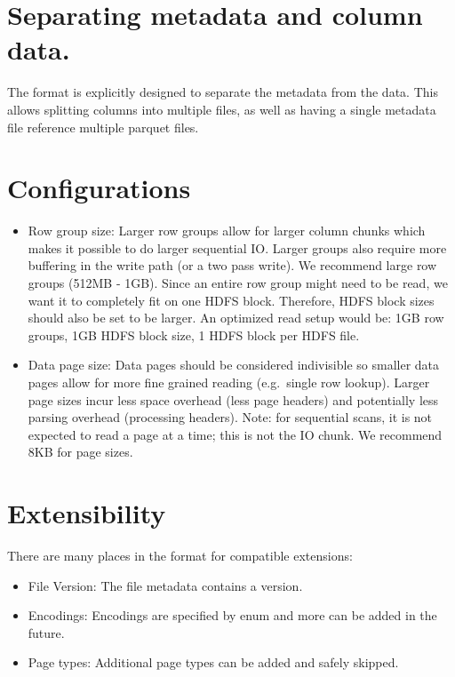 \documentclass[a4paper,12pt,notitlepage,twoside,openright]{article}
\begin{document}
\hypertarget{separating-metadata-and-column-data.}{%
\section{Separating metadata and column
data.}\label{separating-metadata-and-column-data.}}

The format is explicitly designed to separate the metadata from the
data. This allows splitting columns into multiple files, as well as
having a single metadata file reference multiple parquet files.

\hypertarget{configurations}{%
\section{Configurations}\label{configurations}}

\begin{itemize}

\item
  Row group size: Larger row groups allow for larger column chunks which
  makes it possible to do larger sequential IO. Larger groups also
  require more buffering in the write path (or a two pass write). We
  recommend large row groups (512MB - 1GB). Since an entire row group
  might need to be read, we want it to completely fit on one HDFS block.
  Therefore, HDFS block sizes should also be set to be larger. An
  optimized read setup would be: 1GB row groups, 1GB HDFS block size, 1
  HDFS block per HDFS file.
\item
  Data page size: Data pages should be considered indivisible so smaller
  data pages allow for more fine grained reading (e.g.~single row
  lookup). Larger page sizes incur less space overhead (less page
  headers) and potentially less parsing overhead (processing headers).
  Note: for sequential scans, it is not expected to read a page at a
  time; this is not the IO chunk. We recommend 8KB for page sizes.
\end{itemize}

\hypertarget{extensibility}{%
\section{Extensibility}\label{extensibility}}

There are many places in the format for compatible extensions:

\begin{itemize}

\item
  File Version: The file metadata contains a version.
\item
  Encodings: Encodings are specified by enum and more can be added in
  the future.
\item
  Page types: Additional page types can be added and safely skipped.
\end{itemize}
\end{document}

